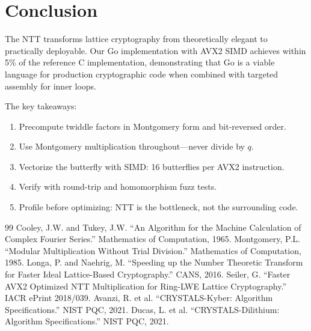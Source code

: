\documentclass[11pt,a4paper]{article}
\begin{document}
\section{Conclusion}

The NTT transforms lattice cryptography from theoretically elegant to practically
deployable. Our Go implementation with AVX2 SIMD achieves within 5\% of the reference C
implementation, demonstrating that Go is a viable language for production cryptographic
code when combined with targeted assembly for inner loops.

The key takeaways:
\begin{enumerate}[nosep]
  \item Precompute twiddle factors in Montgomery form and bit-reversed order.
  \item Use Montgomery multiplication throughout---never divide by $q$.
  \item Vectorize the butterfly with SIMD: 16 butterflies per AVX2 instruction.
  \item Verify with round-trip and homomorphism fuzz tests.
  \item Profile before optimizing: NTT is the bottleneck, not the surrounding code.
\end{enumerate}

\begin{thebibliography}{99}
 Cooley, J.W. and Tukey, J.W. ``An Algorithm for the Machine Calculation of Complex Fourier Series.'' Mathematics of Computation, 1965.
 Montgomery, P.L. ``Modular Multiplication Without Trial Division.'' Mathematics of Computation, 1985.
 Longa, P. and Naehrig, M. ``Speeding up the Number Theoretic Transform for Faster Ideal Lattice-Based Cryptography.'' CANS, 2016.
 Seiler, G. ``Faster AVX2 Optimized NTT Multiplication for Ring-LWE Lattice Cryptography.'' IACR ePrint 2018/039.
 Avanzi, R. et al. ``CRYSTALS-Kyber: Algorithm Specifications.'' NIST PQC, 2021.
 Ducas, L. et al. ``CRYSTALS-Dilithium: Algorithm Specifications.'' NIST PQC, 2021.
\end{thebibliography}
\end{document}
